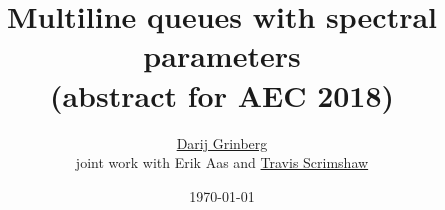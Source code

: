 \documentclass[reqno]{amsart}
\newcommand{\0}{\phantom{c}}
\theoremstyle{plain}
\theoremstyle{definition}
\numberwithin{equation}{section}
\begin{document}
\title[MLQs]{Multiline queues with spectral parameters \\ %
(abstract for AEC 2018)}

\author{\href{http://www.cip.ifi.lmu.de/~grinberg/}{Darij Grinberg}\\
joint work with Erik Aas and \href{https://sites.google.com/view/tscrim/home}{Travis Scrimshaw}}

\date{\today}




\maketitle

\end{document}
